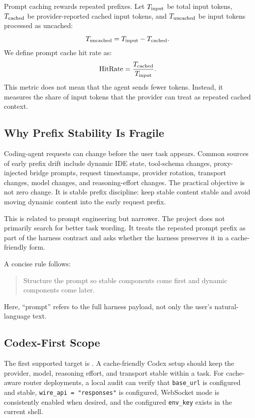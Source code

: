 Prompt caching rewards repeated prefixes. Let $T_{\mathrm{input}}$ be total input tokens, $T_{\mathrm{cached}}$ be provider-reported cached input tokens, and $T_{\mathrm{uncached}}$ be input tokens processed as uncached:
\begin{equation}
    T_{\mathrm{uncached}} = T_{\mathrm{input}} - T_{\mathrm{cached}}.
\end{equation}
We define prompt cache hit rate as:
\begin{equation}
    \mathrm{HitRate} = \frac{T_{\mathrm{cached}}}{T_{\mathrm{input}}}.
\end{equation}
This metric does not mean that the agent sends fewer tokens. Instead, it measures the share of input tokens that the provider can treat as repeated cached context.

\subsection{Why Prefix Stability Is Fragile}

Coding-agent requests can change before the user task appears. Common sources of early prefix drift include dynamic IDE state, tool-schema changes, proxy-injected bridge prompts, request timestamps, provider rotation, transport changes, model changes, and reasoning-effort changes. The practical objective is not zero change. It is stable prefix discipline: keep stable content stable and avoid moving dynamic content into the early request prefix.

This is related to prompt engineering but narrower. The project does not primarily search for better task wording. It treats the repeated prompt prefix as part of the harness contract and asks whether the harness preserves it in a cache-friendly form.

A concise rule follows:
\begin{quote}
Structure the prompt so stable components come first and dynamic components come later.
\end{quote}
Here, ``prompt'' refers to the full harness payload, not only the user's natural-language text.

\subsection{Codex-First Scope}

The first supported target is \codex. A cache-friendly Codex setup should keep the provider, model, reasoning effort, and transport stable within a task. For cache-aware router deployments, a local audit can verify that \texttt{base\_url} is configured and stable, \texttt{wire\_api = "responses"} is configured, WebSocket mode is consistently enabled when desired, and the configured \texttt{env\_key} exists in the current shell.
